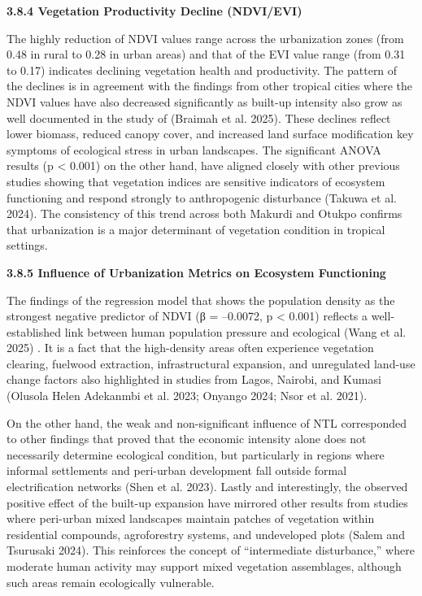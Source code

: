 {}\textbf{3.8.4 Vegetation Productivity Decline (NDVI/EVI)}

The highly reduction of NDVI values range across the urbanization zones (from 0.48 in rural to 0.28 in urban areas) and that of the EVI value range (from 0.31 to 0.17) indicates declining vegetation health and productivity. The pattern of the declines is in agreement with the findings from other tropical cities where the NDVI values have also decreased significantly as built-up intensity also grow as well documented in the study of (Braimah et al. 2025). These declines reflect lower biomass, reduced canopy cover, and increased land surface modification key symptoms of ecological stress in urban landscapes. The significant ANOVA results (p \textless{} 0.001) on the other hand, have aligned closely with other previous studies showing that vegetation indices are sensitive indicators of ecosystem functioning and respond strongly to anthropogenic disturbance (Takuwa et al. 2024). The consistency of this trend across both Makurdi and Otukpo confirms that urbanization is a major determinant of vegetation condition in tropical settings.

{}\textbf{3.8.5 Influence of Urbanization Metrics on Ecosystem Functioning}

The findings of the regression model that shows the population density as the strongest negative predictor of NDVI (β = --0.0072, p \textless{} 0.001) reflects a well-established link between human population pressure and ecological (Wang et al. 2025) . It is a fact that the high-density areas often experience vegetation clearing, fuelwood extraction, infrastructural expansion, and unregulated land-use change factors also highlighted in studies from Lagos, Nairobi, and Kumasi (Olusola Helen Adekanmbi et al. 2023; Onyango 2024; Nsor et al. 2021).

On the other hand, the weak and non-significant influence of NTL corresponded to other findings that proved that the economic intensity alone does not necessarily determine ecological condition, but particularly in regions where informal settlements and peri-urban development fall outside formal electrification networks (Shen et al. 2023). Lastly and interestingly, the observed positive effect of the built-up expansion have mirrored other results from studies where peri-urban mixed landscapes maintain patches of vegetation within residential compounds, agroforestry systems, and undeveloped plots (Salem and Tsurusaki 2024). This reinforces the concept of ``intermediate disturbance,'' where moderate human activity may support mixed vegetation assemblages, although such areas remain ecologically vulnerable.

